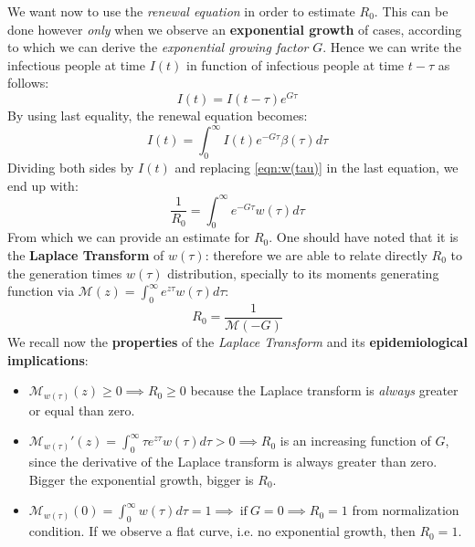 \documentclass[../main/main.tex]{subfiles}
\begin{document}
We want now to use the \textit{renewal equation} in order to estimate $R_0$. This can be done however \textit{only} when we observe an \textbf{exponential growth} of cases, according to which we can derive the \textit{exponential growing factor} $G$. Hence we can write the infectious people at time $I(t)$ in function of infectious people at time $t-\tau$ as follows:
\begin{equation}
    I(t) = I(t-\tau) e^{G\tau}
\end{equation}
By using last equality, the renewal equation becomes:
\begin{equation}
    I(t) = \int_0^\infty I(t) e^{-G \tau } \beta(\tau) d\tau
\end{equation}
Dividing both sides by $I(t)$ and replacing  \ref{eqn:w(tau)} in the last equation, we end up with:
\begin{equation}
    \frac{1}{R_0} = \int_0^\infty e^{-G \tau} w(\tau) d \tau
\end{equation}
From which we can provide an estimate for $R_0$. One should have noted that it is the \textbf{Laplace Transform} of $w(\tau)$: therefore we are able to relate directly $R_0$ to the generation times $w(\tau)$ distribution, specially to its moments generating function via $\mathcal{M}(z) = \int_0^\infty e^{z \tau} w(\tau) d\tau$:
\begin{equation}
     R_0 = \frac{1}{\mathcal{M}(-G)}
\end{equation}
We recall now the \textbf{properties} of the \textit{Laplace Transform} and its \textbf{epidemiological implications}:
\begin{itemize}
\item $\mathcal{M}_{w(\tau)}(z) \geqslant 0 \implies R_0 \geqslant 0$ because the Laplace transform is \textit{always} greater or equal than zero.
\item $\mathcal{M}_{w(\tau)}'(z) = \int_0^\infty \tau e^{z \tau} w(\tau)d\tau >0 \implies R_0$ is an increasing function of $G$, since the derivative of the Laplace transform is always greater than zero. Bigger the exponential growth, bigger is $R_0$.
\item $\mathcal{M}_{w(\tau)}(0) = \int_0^\infty w(\tau) d\tau = 1 \implies \ \text{if} \ G=0 \implies R_0 = 1$ from normalization condition. If we observe a flat curve, i.e. no exponential growth, then $R_0 = 1$.
\end{itemize}
\end{document}
